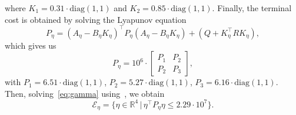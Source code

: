 \documentclass[journal]{IEEEtran}
\newcommand {\matr}[2]{\left[\begin{array}{#1}#2\end{array}\right]}
\begin{document}
	where $K_1=0.31\cdot{}\mathrm{diag}(1,1)$ and $K_2=0.85\cdot{}\mathrm{diag}(1,1)$. Finally, the terminal cost is obtained by solving the Lyapunov equation
	\begin{equation*}
	P_\eta = (A_\eta-B_\eta{}K_\eta)^\top P_\eta (A_\eta-B_\eta{}K_\eta) + (Q + K_\eta^\top R K_\eta),
	\end{equation*}
	which gives us
	\begin{equation}
	P_\eta = 10^6\cdot{}\matr{cc}{P_1 &  P_2\\ P_2 & P_3},
	\end{equation}
	with $P_1=6.51\cdot{}\mathrm{diag}(1,1)$, $P_2=5.27\cdot{}\mathrm{diag}(1,1)$, $P_3=6.16\cdot{}\mathrm{diag}(1,1)$. Then, solving~\eqref{eq:gamma} using~\cite{lofberg2004yalmip}, we obtain
	\begin{equation}
	\mathcal{E}_\eta = \{\eta \in\mathbb{R}^4\, |\, \eta^\top P_\eta \eta\leq{}2.29\cdot{}10^7\}.
	\end{equation}
	
	\ifCLASSOPTIONcaptionsoff
	\newpage
	\fi
	
	
\end{document}
